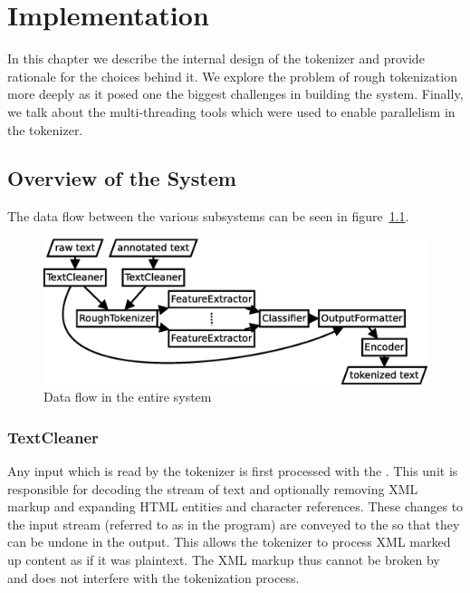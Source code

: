 \chapter{Implementation}
\label{chap:impl}

In this chapter we describe the internal design of the tokenizer and provide
rationale for the choices behind it. We explore the problem of rough
tokenization more deeply as it posed one the biggest challenges in building the
system. Finally, we talk about the multi-threading tools which were used to
enable parallelism in the tokenizer.


\section{Overview of the System}
\label{sec:impl-overview}

The data flow between the various subsystems can be seen in
figure~\ref{fig:all-parts}.

\begin{figure}
  \includegraphics[width=\textwidth]{img/all-parts.eps}
  \caption{Data flow in the entire system}
  \label{fig:all-parts}
\end{figure}

\subsection{TextCleaner}
\label{ssec:impl-overview-textcleaner}

Any input which is read by the tokenizer is first processed with the
. This unit is responsible for decoding the stream of text
and optionally removing XML markup and expanding HTML entities and character
references. These changes to the input stream (referred to as 
in the program) are conveyed to the  so that they can be
undone in the output. This allows the tokenizer to process XML marked up
content as if it was plaintext. The XML markup thus cannot be broken by and
does not interfere with the tokenization process.

